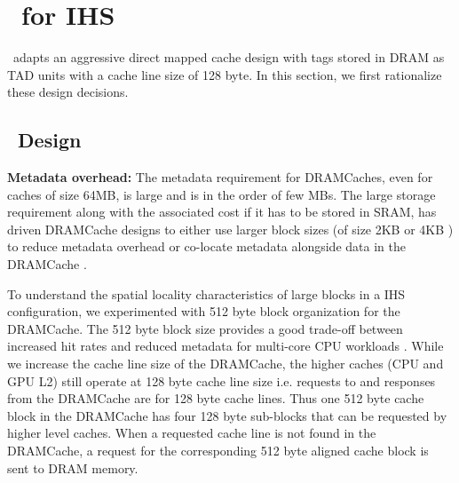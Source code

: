 \section{\cachename\ for IHS} \label{design+mechanism}
\cachename\ adapts an aggressive direct mapped cache design with tags stored in DRAM as TAD units \cite{alloy} with a cache line size of 128 byte. In this section, we first rationalize these design decisions.

\subsection{\cachename\ Design} \label{design}

\par \textbf{Metadata overhead:} The metadata requirement for DRAMCaches, even for caches of size 64MB, is large and is in the order of few MBs. The large storage requirement along with the associated cost if it has to be stored in SRAM, has driven DRAMCache designs to either use larger block sizes (of size 2KB or 4KB \cite{footprint,unison-cache}) to reduce metadata overhead or co-locate metadata alongside data in the DRAMCache \cite{loh-hill,alloy,atcache}. 
\par To understand the spatial locality characteristics of large blocks in a IHS configuration, we experimented with 512 byte block organization for the DRAMCache. 
The 512 byte block size provides a good trade-off between increased hit rates and reduced metadata for multi-core CPU workloads \cite{bimodal}. While we increase the cache line size of the DRAMCache, the higher caches (CPU and GPU L2) still operate at 128 byte cache line size i.e. requests to and responses from the DRAMCache are for 128 byte cache lines. Thus one 512 byte cache block in the DRAMCache has four 128 byte sub-blocks that can be requested by higher level caches. When a requested cache line is not found in the DRAMCache, a request for the corresponding 512 byte aligned cache block is sent to DRAM memory.
